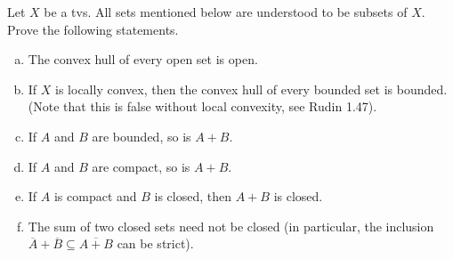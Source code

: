 \begin{exercise}
	Let $X$ be a tvs. All sets mentioned below are understood to be subsets of $X$. Prove the following statements.
	\begin{enumerate}[(a)]
		\item The convex hull of every open set is open.
		\item If $X$ is locally convex, then the convex hull of every bounded set is bounded. (Note that this is false without local convexity, see Rudin 1.47).
		\item If $A$ and $B$ are bounded, so is $A+B$.
		\item If $A$ and $B$ are compact, so is $A+B$.
		\item If $A$ is compact and $B$ is closed, then $A+B$ is closed.
		\item The sum of two closed sets need not be closed (in particular, the inclusion $\overline{A}+\overline{B} \subseteq \overline{A+B}$ can be strict).
	\end{enumerate}
\end{exercise}

